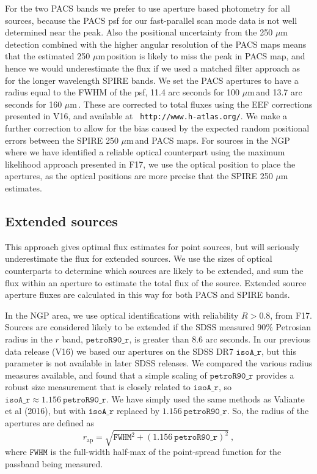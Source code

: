 \documentclass[useAMS,usenatbib]{mn2e}
\def\mic{ $\mu $m\,}
\begin{document}
For the two PACS bands we prefer to use aperture based photometry for
all sources, because the PACS psf for our fast-parallel scan mode data
is not well determined near the peak. Also the positional uncertainty
from the 250\mic detection combined with the higher angular resolution
of the PACS maps means that the estimated 250\mic position is likely
to miss the peak in PACS map, and hence we would underestimate the
flux if we used a matched filter approach as for the longer wavelength
SPIRE bands. We set the PACS apertures to have a radius equal to the
FWHM of the psf, 11.4 arc seconds for 100\mic and 13.7 arc seconds for
160\mic.  These are corrected to total fluxes using the EEF
corrections presented in V16, and available at {\tt
  http://www.h-atlas.org/}.  We make a further correction to allow for
the bias caused by the expected random positional errors between the
SPIRE 250\mic and PACS maps.
For sources in the NGP where we have identified a reliable optical
counterpart using the maximum likelihood approach presented in
F17, we use the optical position to place the
apertures, as the optical positions are more precise that the SPIRE
250\mic estimates. 

\subsection{Extended sources} 

This approach gives optimal flux estimates for point sources, but will
seriously underestimate the flux for extended sources. We use the
sizes of optical counterparts to determine which sources are likely to
be extended, and sum the flux within an aperture to estimate the total
flux of the source. Extended source aperture fluxes are calculated in
this way for both PACS and SPIRE bands. 

In the NGP area, we use optical identifications
with reliability $R>0.8$, from F17.  Sources are
considered likely to be extended if the SDSS measured 90\% Petrosian
radius in the $r$ band, $\mathtt{petroR90\_r}$, is greater than 8.6
arc seconds. In our previous data release (V16) we based our apertures
on the SDSS DR7 $\mathtt{isoA\_r}$, but this parameter is not
available in later SDSS releases. We compared the various radius
measures available, and found that a simple scaling of
$\mathtt{petroR90\_r}$ provides a robust size measurement that is
closely related to $\mathtt{isoA\_r}$, so $\mathtt{isoA\_r} \approx
1.156 \ \mathtt{petroR90\_r}$.  We have simply used the same methods
as Valiante et al (2016), but with $\mathtt{isoA\_r}$ replaced by
$1.156 \ \mathtt{petroR90\_r}$. So, the radius of the apertures are
defined as
\begin{equation} 
r_\mathrm{ap} = \sqrt{ \mathtt{FWHM}^2 + {(1.156
    \ \mathtt{petroR90\_r})}^2}\ , 
\end{equation}
where $\mathtt{FWHM}$ is the full-width half-max of the point-spread
function for the passband being measured.  
\end{document}
